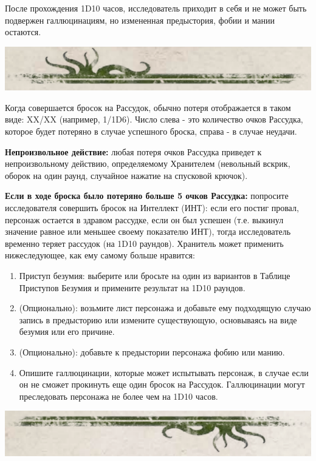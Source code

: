 \documentclass[letterpaper,twocolumn,openany, twoside, 11pt, usenames]{cocbook}
\begin{document}
После прохождения 1D10 часов, исследователь приходит в себя и не может быть подвержен галлюцинациям, но измененная предыстория, фобии и мании остаются.
  \begin{fullcocpaperbox}{}{}
  \includegraphics[width=\linewidth]{img/top.png}
  \begin{multicols}{2}
    Когда совершается бросок на Рассудок, обычно потеря отображается в таком виде: XX/XX (например, 1/1D6). Число слева - это количество очков Рассудка, которое будет потеряно в случае успешного броска, справа - в случае неудачи.

    \textbf{Непроизвольное действие:} любая потеря очков Рассудка приведет к непроизвольному действию, определяемому Хранителем (невольный вскрик, оборок на один раунд, случайное нажатие на спусковой крючок).

    \textbf{Если в ходе броска было потеряно больше 5 очков Рассудка:} попросите исследователя совершить бросок на Интеллект (ИНТ): если его постиг провал, персонаж остается в здравом рассудке, если он был успешен (т.е. выкинул значение равное или меньшее своему показателю ИНТ), тогда исследователь временно теряет рассудок (на 1D10 раундов). Хранитель может применить нижеследующее, как ему самому больше нравится:

    \begin{enumerate}
    \item Приступ безумия: выберите или бросьте на один из вариантов в Таблице Приступов Безумия и примените результат на 1D10 раундов.
    \item (Опционально): возьмите лист персонажа и добавьте ему подходящую случаю запись в предысторию или измените существующую, основываясь на виде безумия или его причине.
    \item  (Опционально): добавьте к предыстории персонажа фобию или манию.
    \item  Опишите галлюцинации, которые может испытывать персонаж, в случае если он не сможет прокинуть еще один бросок на Рассудок. Галлюцинации могут преследовать персонажа не более чем на 1D10 часов.
    \end{enumerate}
  \end{multicols}
  \includegraphics[width=\linewidth]{img/bottom.png}
\end{fullcocpaperbox}
\end{document}

